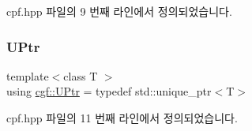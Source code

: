 cpf.\+hpp 파일의 9 번째 라인에서 정의되었습니다.

\mbox{\label{namespacecgf_a4eedd20a933c30d03183a0f373dc21ab}} 
\subsubsection{\texorpdfstring{U\+Ptr}{UPtr}}
{\footnotesize\ttfamily template$<$class T $>$ \\
using \hyperlink{namespacecgf_a4eedd20a933c30d03183a0f373dc21ab}{cgf\+::\+U\+Ptr} = typedef std\+::unique\+\_\+ptr$<$T$>$}



cpf.\+hpp 파일의 11 번째 라인에서 정의되었습니다.


